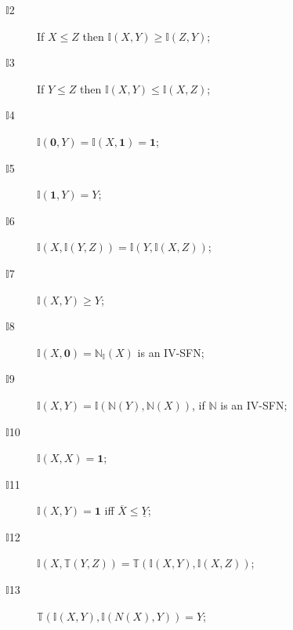 \documentclass[conference]{IEEEtran}
\theoremstyle{plain}
\theoremstyle{remark}
\theoremstyle{definition}
\theoremstyle{proposition}
\begin{document}
\begin{description}
\item [$\mathbb{I}$2] If $X \leq Z$ then $\mathbb{I}(X,Y) \geq \mathbb{I}(Z,Y)$;
\item [$\mathbb{I}$3] If $Y \leq Z$ then $\mathbb{I}(X,Y) \leq \mathbb{I}(X,Z)$;
\item [$\mathbb{I}$4] $\mathbb{I}(\mathbf{0},Y) = \mathbb{I}(X,\mathbf{1})=\mathbf{1}$;
\item [$\mathbb{I}$5] $\mathbb{I}(\mathbf{1},Y) = Y$;
\item [$\mathbb{I}$6] $\mathbb{I}(X,\mathbb{I}(Y,Z))= \mathbb{I}(Y,\mathbb{I}(X,Z))$;
\item [$\mathbb{I}$7] $\mathbb{I}(X,Y) \geq Y $;
\item [$\mathbb{I}$8] $\mathbb{I}(X,\mathbf{0}) = \mathbb{N}_{\mathbb{I}}(X)$ is an IV-SFN;
\item [$\mathbb{I}$9] $\mathbb{I}(X,Y)=  \mathbb{I}(\mathbb{N}(Y),\mathbb{N}(X))$, if $\mathbb{N}$ is an IV-SFN;
\item [$\mathbb{I}$10] $\mathbb{I}(X,X)=\mathbf{1}$;
\item [$\mathbb{I}$11] $\mathbb{I}(X,Y)=\mathbf{1}$ iff $\overline{X}\leq \underline{Y}$;
%
\item [$\mathbb{I}$12] $\mathbb{I}(X,\mathbb{T}(Y,Z))=  \mathbb{T}(\mathbb{I}(X,Y),\mathbb{I}(X,Z))$;
\item [$\mathbb{I}$13] $\mathbb{T}(\mathbb{I}(X,Y),\mathbb{I}(N(X),Y))=Y$;
\end{description}
\end{document}
